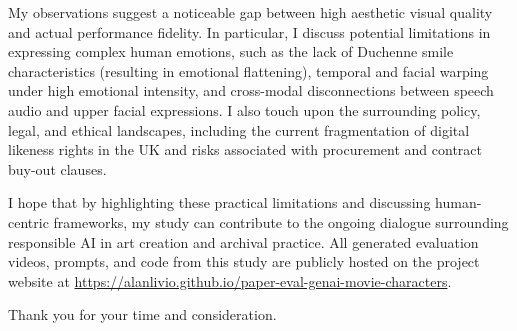 \documentclass[10pt,a4paper,sans,colorlinks]{moderncv}
\begin{document}
My observations suggest a noticeable gap between high aesthetic visual quality and actual performance fidelity. In particular, I discuss potential limitations in expressing complex human emotions, such as the lack of Duchenne smile characteristics (resulting in emotional flattening), temporal and facial warping under high emotional intensity, and cross-modal disconnections between speech audio and upper facial expressions. I also touch upon the surrounding policy, legal, and ethical landscapes, including the current fragmentation of digital likeness rights in the UK and risks associated with procurement and contract buy-out clauses.

I hope that by highlighting these practical limitations and discussing human-centric frameworks, my study can contribute to the ongoing dialogue surrounding responsible AI in art creation and archival practice. All generated evaluation videos, prompts, and code from this study are publicly hosted on the project website at \url{https://alanlivio.github.io/paper-eval-genai-movie-characters}.

Thank you for your time and consideration.

\makeletterclosing
\end{document}
